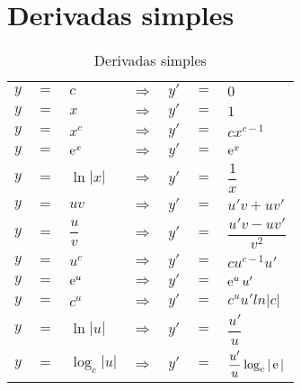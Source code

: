 \section{Derivadas simples}
	\begin{table}[H]
		\caption{Derivadas simples}
		\label{derivadas_simples}
		\centering
		\begin{tabular}{|lclclcl|}
			$y$ & $=$ & $c$            & $\Rightarrow$ & $y'$ & $=$ & $0$                       \\
			$y$ & $=$ & $x$            & $\Rightarrow$ & $y'$ & $=$ & $1$                       \\
			$y$ & $=$ & $x^c$          & $\Rightarrow$ & $y'$ & $=$ & $cx^{c - 1}$              \\
			$y$ & $=$ & $\operatorname{e}^x$         & $\Rightarrow$ & $y'$ & $=$ & $\operatorname{e}^x$                    \\
			$y$ & $=$ & $\ln |x|$      & $\Rightarrow$ & $y'$ & $=$ & $\dfrac{1}{x}$            \\
			$y$ & $=$ & $uv$           & $\Rightarrow$ & $y'$ & $=$ & $u'v + uv'$               \\
			$y$ & $=$ & $\dfrac{u}{v}$ & $\Rightarrow$ & $y'$ & $=$ & $\dfrac{u'v - uv'}{v^2}$  \\
			$y$ & $=$ & $u^c$          & $\Rightarrow$ & $y'$ & $=$ & $cu^{c - 1}u'$            \\
			$y$ & $=$ & $\operatorname{e}^u$         & $\Rightarrow$ & $y'$ & $=$ & $\operatorname{e}^uu'$                  \\
			$y$ & $=$ & $c^u$          & $\Rightarrow$ & $y'$ & $=$ & $c^uu'ln|c|$              \\
			$y$ & $=$ & $\ln |u|$      & $\Rightarrow$ & $y'$ & $=$ & $\dfrac{u'}{u}$           \\
			$y$ & $=$ & $\log_c|u|$    & $\Rightarrow$ & $y'$ & $=$ & $\dfrac{u'}{u}\log_c|\operatorname{e}|$
		\end{tabular}		
	\end{table}

